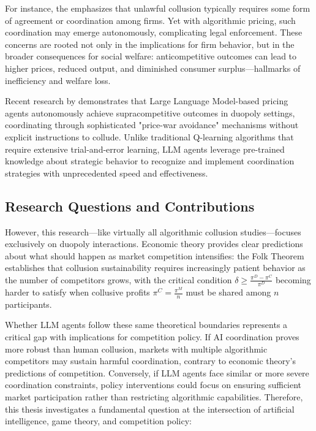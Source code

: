 For instance, the \textcite{us_department_of_justice_price_2021} emphasizes that unlawful collusion typically requires some form of agreement or coordination among firms. Yet with algorithmic pricing, such coordination may emerge autonomously, complicating legal enforcement. These concerns are rooted not only in the implications for firm behavior, but in the broader consequences for social welfare: anticompetitive outcomes can lead to higher prices, reduced output, and diminished consumer surplus—hallmarks of inefficiency and welfare loss.

Recent research by \textcite{fish_algorithmic_2025} demonstrates that Large Language Model-based pricing agents autonomously achieve supracompetitive outcomes in duopoly settings, coordinating through sophisticated "price-war avoidance" mechanisms without explicit instructions to collude. Unlike traditional Q-learning algorithms that require extensive trial-and-error learning, LLM agents leverage pre-trained knowledge about strategic behavior to recognize and implement coordination strategies with unprecedented speed and effectiveness.


\subsection{Research Questions and Contributions}
However, this research—like virtually all algorithmic collusion studies—focuses exclusively on duopoly interactions. Economic theory provides clear predictions about what should happen as market competition intensifies: the Folk Theorem establishes that collusion sustainability requires increasingly patient behavior as the number of competitors grows, with the critical condition $\delta \geq \frac{\pi^D - \pi^C}{\pi^D}$ becoming harder to satisfy when collusive profits $\pi^C = \frac{\pi^M}{n}$ must be shared among $n$ participants.

Whether LLM agents follow these same theoretical boundaries represents a critical gap with implications for competition policy. If AI coordination proves more robust than human collusion, markets with multiple algorithmic competitors may sustain harmful coordination, contrary to economic theory's predictions of competition. Conversely, if LLM agents face similar or more severe coordination constraints, policy interventions could focus on ensuring sufficient market participation rather than restricting algorithmic capabilities. Therefore, this thesis investigates a fundamental question at the intersection of artificial intelligence, game theory, and competition policy:

